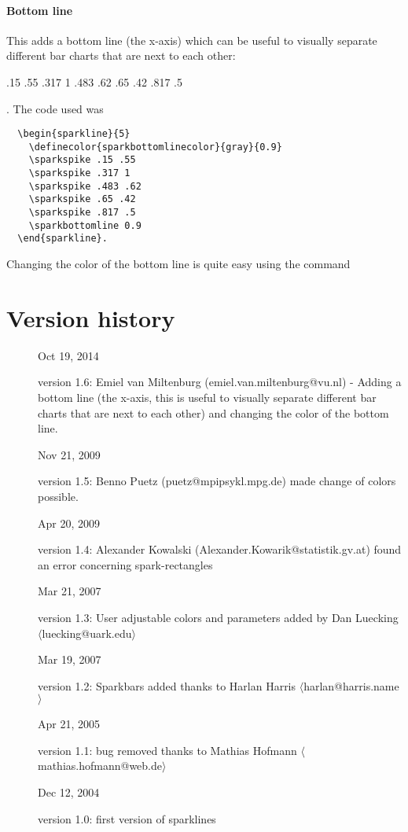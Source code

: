\documentclass{article}
\begin{document}
\paragraph{Bottom line} This adds a bottom line (the x-axis) which can be useful to visually separate different bar charts that are next to each other: 
\begin{sparkline}{5}
\sparkspike .15 .55
\sparkspike .317 1
\sparkspike .483 .62
\sparkspike .65 .42
\sparkspike .817 .5
\end{sparkline}. 
The code used was 
\begin{verbatim}
  \begin{sparkline}{5}
	\definecolor{sparkbottomlinecolor}{gray}{0.9}
    \sparkspike .15 .55
    \sparkspike .317 1
    \sparkspike .483 .62
    \sparkspike .65 .42
    \sparkspike .817 .5
	\sparkbottomline 0.9
  \end{sparkline}.
\end{verbatim}
Changing the color of the bottom line is quite easy using the command

\section*{Version history}
\begin{description}
	\item[] Oct 19, 2014

	version 1.6: Emiel van Miltenburg (emiel.van.miltenburg@vu.nl) - Adding a bottom line (the x-axis, this is useful to visually separate different bar charts that are next to each other) and changing the color of the bottom line.

\item[] Nov 21, 2009

version 1.5: Benno Puetz (puetz@mpipsykl.mpg.de) made change of colors possible.

\item[] Apr 20, 2009

    version 1.4: Alexander Kowalski (Alexander.Kowarik@statistik.gv.at) found an error concerning spark-rectangles

\item[] Mar 21, 2007

    version 1.3: User adjustable colors and parameters added by Dan
    Luecking $\langle$luecking@uark.edu$\rangle$

\item[] Mar 19, 2007

    version 1.2: Sparkbars added thanks to Harlan Harris
    $\langle$harlan@harris.name$\rangle$

\item[] Apr 21, 2005

    version 1.1: bug removed thanks to Mathias Hofmann
    $\langle$mathias.hofmann@web.de$\rangle$

\item[] Dec 12, 2004

    version 1.0: first version of sparklines
\end{description}
\end{document}
